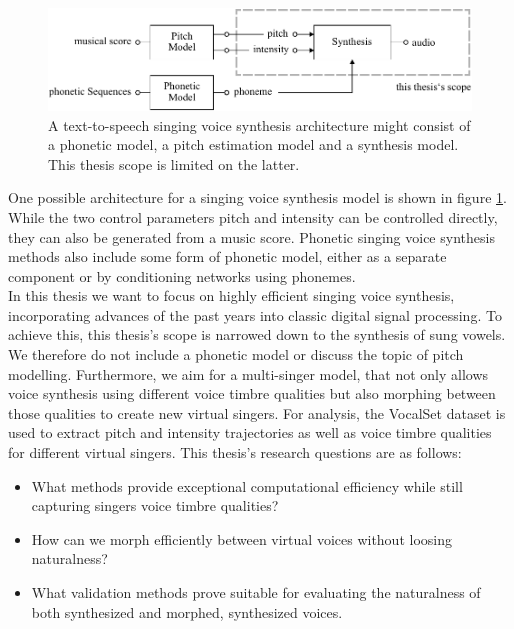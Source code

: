 \documentclass{article}
\begin{document}
\begin{figure}[H]
    \centering
    \includegraphics{Graphics/004_thesis_scope.pdf}
    \caption{A text-to-speech singing voice synthesis architecture might consist of a phonetic model, a pitch estimation model and a synthesis model. This thesis scope is limited on the latter.}
    \label{fig:thesis_architecture_scope}
\end{figure}

One possible architecture for a singing voice synthesis model is shown in figure \ref{fig:thesis_architecture_scope}. While the two control parameters pitch and intensity can be controlled directly, they can also be generated from a music score. Phonetic singing voice synthesis methods also include some form of phonetic model, either as a separate component or by conditioning networks using phonemes.\\
In this thesis we want to focus on highly efficient singing voice synthesis, incorporating advances of the past years into classic digital signal processing. To achieve this, this thesis's scope is narrowed down to the synthesis of sung vowels. We therefore do not include a phonetic model or discuss the topic of pitch modelling.
Furthermore, we aim for a multi-singer model, that not only allows voice synthesis using different voice timbre qualities but also morphing between those qualities to create new virtual singers. For analysis, the VocalSet dataset \cite{wilkins_vocalset:_2018} is used to extract pitch and intensity trajectories as well as voice timbre qualities for different virtual singers. This thesis's research questions are as follows:

\begin{itemize}
    \item What methods provide exceptional computational efficiency while still capturing singers voice timbre qualities?
    \item How can we morph efficiently between virtual voices without loosing naturalness?
    \item What validation methods prove suitable for evaluating the naturalness of both synthesized and morphed, synthesized voices.
\end{itemize}
\end{document}
